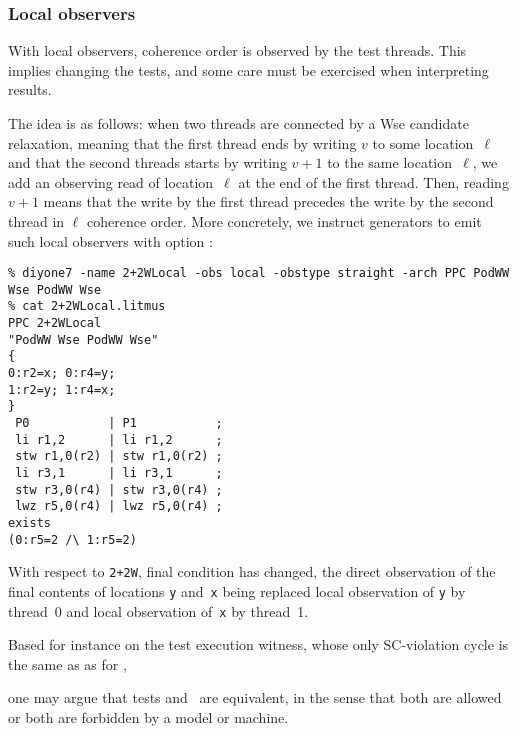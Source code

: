\subsubsection{Local observers}
With local observers, coherence order is observed by the test threads.
This implies changing the tests, and some care must be exercised when
interpreting results.

The idea is as follows: when two threads are connected by a Wse candidate
relaxation, meaning that the first thread ends by writing $v$ to some location~$\ell$ and that the second threads starts by writing $v+1$ to the same location~$\ell$, we add an observing read of location~$\ell$ at the end of
the first thread. Then, reading $v+1$ means that the write by the first thread
precedes the write by the second thread in $\ell$ coherence order.
More concretely, we instruct \diy{} generators to emit such local observers
with option :
\begin{verbatim}
% diyone7 -name 2+2WLocal -obs local -obstype straight -arch PPC PodWW Wse PodWW Wse
% cat 2+2WLocal.litmus
PPC 2+2WLocal
"PodWW Wse PodWW Wse"
{
0:r2=x; 0:r4=y;
1:r2=y; 1:r4=x;
}
 P0           | P1           ;
 li r1,2      | li r1,2      ;
 stw r1,0(r2) | stw r1,0(r2) ;
 li r3,1      | li r3,1      ;
 stw r3,0(r4) | stw r3,0(r4) ;
 lwz r5,0(r4) | lwz r5,0(r4) ;
exists
(0:r5=2 /\ 1:r5=2)
\end{verbatim}
With respect to \texttt{2+2W}, final condition has changed, the direct
observation of the final contents of locations \texttt{y} and~\texttt{x}
being replaced local observation of \texttt{y} by thread~0 and
local observation of~\texttt{x} by thread~1.

Based for instance on the test execution witness, whose only SC-violation
cycle is the same as as  for ,
\begin{center}
\end{center}
one may argue that tests
 and~ are equivalent, in the sense that
both are allowed or both are forbidden by a model or machine.

